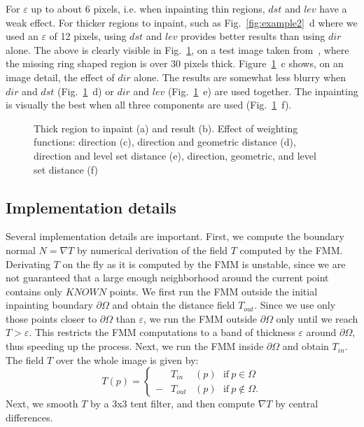 \documentclass{llncs}
\begin{document}
For $\varepsilon$ up to about
6 pixels, i.e. when inpainting thin regions, $dst$ and $lev$ have
a weak effect. For thicker regions to inpaint, such as
Fig.~\ref{fig:example2}~d where we used an $\varepsilon$ of 12 pixels, 
using $dst$ and $lev$ provides better
results than using $dir$ alone. The above is clearly visible in
Fig.~\ref{fig:ellipse}, on a test image taken from~\cite{bertalmio1},  where
the missing ring shaped region is over 30 pixels thick.
Figure~\ref{fig:ellipse}~c shows, on an image detail, the effect of $dir$ alone. The results are
somewhat less blurry when $dir$ and $dst$ (Fig.~\ref{fig:ellipse}~d) or
$dir$ and $lev$ (Fig.~\ref{fig:ellipse}~e) are used together. The inpainting
is visually the best when all three components are used (Fig.~\ref{fig:ellipse}~f).
%
%
	\begin{figure}[h] \centering
	\caption{Thick region to inpaint (a) and result (b). Effect of weighting functions: 
         direction (c), direction and geometric distance (d), direction and level set distance (e),
         direction, geometric, and level set distance (f)}
	\label{fig:ellipse} 
        \end{figure} 
%
%
%
%
\subsection{Implementation details}
\label{sec:implem}
%
%
  Several implementation details are important. First, we compute the
boundary normal $N=\nabla T$ by numerical derivation of the field $T$
computed by the FMM. Derivating $T$ on the fly as it is computed by the
FMM is unstable, since we are not guaranteed that a large enough
neighborhood around the current point contains only $KNOWN$ points.
We first run the FMM outside the initial inpainting boundary
$\partial\Omega$ and obtain the distance field $T_{out}$. Since we use only
those points closer to $\partial\Omega$ than $\varepsilon$, we run the FMM
outside $\partial\Omega$ only until we reach $T > \varepsilon$. This
restricts the FMM computations to a band of thickness $\varepsilon$ around
$\partial\Omega$, thus speeding up the process. Next, we run the FMM
inside $\partial\Omega$ and obtain $T_{in}$. The field $T$ over the whole
image is given by:
%
\begin{equation}
T(p) = \left\{
      \begin{array}{rcl}
      &T_{in}&(p)~~~\mbox{if}~p \in \Omega\\
      -&T_{out}&(p)~~~\mbox{if}~p \notin \Omega.
\end{array}
\right.
\end{equation}
%
Next, we smooth $T$ by a 3x3 tent filter, and then compute $\nabla T$ by
central differences. 
\end{document}
